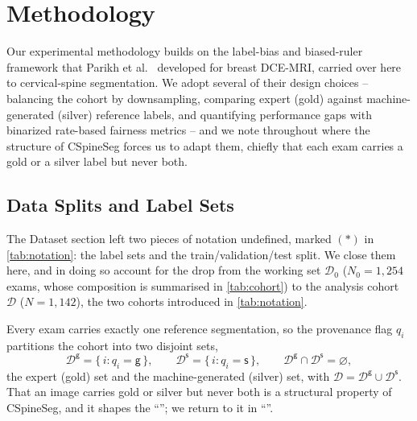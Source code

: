 \section{Methodology}
\label{sec:methodology}


Our experimental methodology builds on the label-bias and biased-ruler framework
that Parikh et al.~\cite{parikh2025labelbias,parikh2025whofails} developed for
breast DCE-MRI, carried over here to cervical-spine segmentation. We adopt
several of their design choices -- balancing the cohort by downsampling,
comparing expert (gold) against machine-generated (silver) reference labels, and
quantifying performance gaps with binarized rate-based fairness metrics -- and we
note throughout where the structure of CSpineSeg forces us to adapt them, chiefly
that each exam carries a gold or a silver label but never both.

\subsection{Data Splits and Label Sets}
\label{sec:splits}

The Dataset section left two pieces of notation undefined, marked $(\ast)$ in
\autoref{tab:notation}: the label sets and the train/validation/test split. We
close them here, and in doing so account for the drop from the working set
$\mathcal{D}_0$ ($N_0 = 1{,}254$ exams, whose composition is summarised in
\autoref{tab:cohort}) to the analysis cohort $\mathcal{D}$ ($N = 1{,}142$), the
two cohorts introduced in \autoref{tab:notation}.

Every exam carries exactly one reference segmentation, so the provenance flag
$q_i$ partitions the cohort into two disjoint sets,
\begin{equation}
  \mathcal{D}^{\mathsf{g}} = \{\, i : q_i = \mathsf{g} \,\},
  \qquad
  \mathcal{D}^{\mathsf{s}} = \{\, i : q_i = \mathsf{s} \,\},
  \qquad
  \mathcal{D}^{\mathsf{g}} \cap \mathcal{D}^{\mathsf{s}} = \varnothing,
\end{equation}
the expert (gold) set and the machine-generated (silver) set, with
$\mathcal{D} = \mathcal{D}^{\mathsf{g}} \cup \mathcal{D}^{\mathsf{s}}$. That an
image carries gold or silver but never both is a structural property of
CSpineSeg, and it shapes the ``''; we
return to it in ``''.

